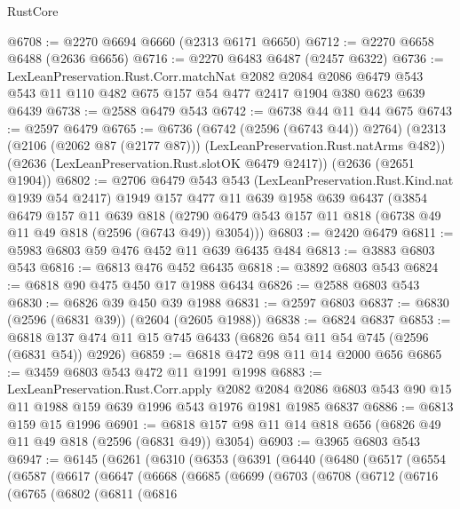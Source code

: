 \begin{lexlean}{RustCore}
\begin{coremodule}
@6708 := @2270 @6694 @6660 (@2313 @6171 @6650)
@6712 := @2270 @6658 @6488 (@2636 @6656)
@6716 := @2270 @6483 @6487 (@2457 @6322)
@6736 := LexLeanPreservation.Rust.Corr.matchNat
    @2082
    @2084
    @2086
    @6479
    @543
    @543
    @11
    @110
    @482
    @675
    @157
    @54
    @477
    @2417
    @1904
    @380
    @623
    @639
    @6439
@6738 := @2588 @6479 @543
@6742 := @6738 @44 @11 @44 @675
@6743 := @2597 @6479
@6765 := @6736
    (@6742 (@2596 (@6743 @44)) @2764)
    (@2313 (@2106 (@2062 @87 (@2177 @87))) (LexLeanPreservation.Rust.natArms @482))
    (@2636 (LexLeanPreservation.Rust.slotOK @6479 @2417))
    (@2636 (@2651 @1904))
@6802 := @2706
    @6479
    @543
    @543
    (LexLeanPreservation.Rust.Kind.nat @1939 @54 @2417)
    @1949
    @157
    @477
    @11
    @639
    @1958
    @639
    @6437
    (@3854
      @6479
      @157
      @11
      @639
      @818
      (@2790 @6479 @543 @157 @11 @818 (@6738 @49 @11 @49 @818 (@2596 (@6743 @49)) @3054)))
@6803 := @2420 @6479
@6811 := @5983 @6803 @59 @476 @452 @11 @639 @6435 @484
@6813 := @3883 @6803 @543
@6816 := @6813 @476 @452 @6435
@6818 := @3892 @6803 @543
@6824 := @6818 @90 @475 @450 @17 @1988 @6434
@6826 := @2588 @6803 @543
@6830 := @6826 @39 @450 @39 @1988
@6831 := @2597 @6803
@6837 := @6830 (@2596 (@6831 @39)) (@2604 (@2605 @1988))
@6838 := @6824 @6837
@6853 := @6818 @137 @474 @11 @15 @745 @6433 (@6826 @54 @11 @54 @745 (@2596 (@6831 @54)) @2926)
@6859 := @6818 @472 @98 @11 @14 @2000 @656
@6865 := @3459 @6803 @543 @472 @11 @1991 @1998
@6883 := LexLeanPreservation.Rust.Corr.apply
    @2082
    @2084
    @2086
    @6803
    @543
    @90
    @15
    @11
    @1988
    @159
    @639
    @1996
    @543
    @1976
    @1981
    @1985
    @6837
@6886 := @6813 @159 @15 @1996
@6901 := @6818 @157 @98 @11 @14 @818 @656 (@6826 @49 @11 @49 @818 (@2596 (@6831 @49)) @3054)
@6903 := @3965 @6803 @543
@6947 := @6145
    (@6261
      (@6310
        (@6353
          (@6391
            (@6440
              (@6480
                (@6517
                  (@6554
                    (@6587
                      (@6617
                        (@6647
                          (@6668
                            (@6685
                              (@6699
                                (@6703
                                  (@6708
                                    (@6712
                                      (@6716
                                        (@6765
                                          (@6802
                                            (@6811
                                              (@6816

\end{coremodule}
\end{lexlean}
